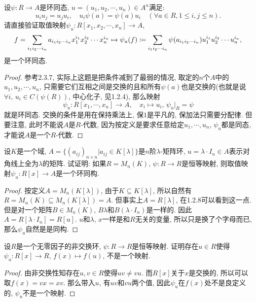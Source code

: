 \documentclass{../solutions-cn}
\begin{document}
\begin{exercise}[习题2.4.5]
    设$\psi:R \to A$是环同态, $u = (u_1, u_2, \cdots, u_n) \in A^n$满足:
    \[
        u_iu_j = u_ju_i,\quad u_i\psi(a) = \psi(a)u_i \quad (\forall a \in R, 1 \leqslant i, j \leqslant n).
    \]
    请直接验证取值映射$\psi_u:R[x_1, x_2, \cdots, x_n] \to A$,
    \[
        f = \sum_{i_1i_2\cdots i_n} a_{i_1i_2\cdots i_n}x_1^{i_1}x_2^{i_2}\cdots x_n^{i_n} \mapsto \psi_u(f) \mathrel{\coloneqq} \sum_{i_1i_2\cdots i_n} \psi(a_{i_1i_2\cdots i_n})u_1^{i_1}u_2^{i_2}\cdots u_n^{i_n},
    \]
    是一个环同态.
\end{exercise}

\begin{proof}
    参考2.3.7, 实际上这题是把条件减到了最弱的情况, 取定的$n$个$A$中的$u_1, u_2, \cdots, u_n$, 只需要它们互相之间是交换的且和所有$\psi(a)$也是交换的(也就是说$\forall i,\, u_i \in C(\psi(R))$, 中心化子, 见1.2.4), 那么映射
    \[
        \psi_u:R[x_1, \cdots, x_n] \to A,\quad x_i \mapsto u_i,\,  \psi_u|_R = \psi
    \]
    就是环同态. 交换的条件是用在保持乘法上, 保$1$是平凡的, 保加法只需要分配律. 但要注意, 此时不能说$A$是$R$-代数, 因为按定义是要求任意给定$u_1, \cdots, u_n$, $\psi_u$都是同态, 才能说$A$是一个$R$-代数.
\end{proof}

\begin{exercise}[习题2.4.6]
    设$K$是一个域, $A = \{(a_{ij})_{n \times n}|a_{ij} \in K[\lambda]\}$是$n$阶$\lambda$-矩阵环, $u = \lambda \cdot I_n \in A$表示对角线上全为$\lambda$的矩阵. 试证明: 如果$R = M_n(K),\, \psi:R \to R$是恒等映射, 则取值映射$\psi_u:R[x] \to A$是一个环同构.
\end{exercise}

\begin{proof}
    按定义$A = M_n(K[\lambda])$, 由于$K \subseteq K[\lambda]$, 所以自然有$R = M_n(K) \subseteq M_n(K[\lambda]) = A$. 但事实上$A = R[\lambda]$, 在1.2.8可以看到这一点. 但是对一个矩阵$B \in M_n(K)$, $B\lambda$和$B(\lambda \cdot I_n)$是一样的. 因此$A = R[\lambda \cdot I_n] = R[u]$. $u$和$\lambda$, $x$一样是和$R$无关的变量, 所以只是换了个字母而已, 那么$\psi_u$自然是是同构.
\end{proof}

\begin{exercise}[习题2.4.7]
    设$R$是一个无零因子的非交换环, $\psi:R \to R$是恒等映射. 证明存在$u \in R$使得$\psi_u:R[x] \to R$, $f(x) \mapsto f(u)$, 不是一个映射.
\end{exercise}
    
\begin{proof}
    由非交换性知存在$u, v \in R$使得$uv \neq vu$. 而$R[x]$关于$x$是交换的, 所以可以取$f(x) = vx = xv$. 那么带入$u$, 有$uv$和$vu$两个值, 因此$\psi_u$在$f(x)$处不是良定义的, $\psi_u$不是一个映射.
\end{proof}
\end{document}
